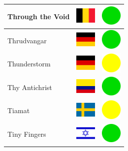 \documentclass[12pt, a4paper, twoside]{report}
\begin{document}
\begin{center}
\begin{longtable}{|p{5cm}|p{2cm}|p{2cm}|}
 Through the Void                                           & \includegraphics[width=1cm]{../4x3/be} &   \includegraphics[width=1cm]{../likes/y} \\ \hline
 Thrudvangar                                                & \includegraphics[width=1cm]{../4x3/de} &   \includegraphics[width=1cm]{../likes/y} \\ \hline
 Thunderstorm                                               & \includegraphics[width=1cm]{../4x3/de} &   \includegraphics[width=1cm]{../likes/m} \\ \hline
 Thy Antichrist                                             & \includegraphics[width=1cm]{../4x3/co} &   \includegraphics[width=1cm]{../likes/y} \\ \hline
 Tiamat                                                     & \includegraphics[width=1cm]{../4x3/se} &   \includegraphics[width=1cm]{../likes/m} \\ \hline
 Tiny Fingers                                               & \includegraphics[width=1cm]{../4x3/il} &   \includegraphics[width=1cm]{../likes/y} \\ \hline

\end{longtable}
\end{center}
\end{document}
